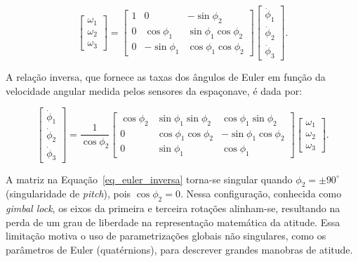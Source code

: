 \begin{equation}
\begin{bmatrix}
\omega_1 \\[2pt] \omega_2 \\[2pt] \omega_3
\end{bmatrix}
=
\begin{bmatrix}
1 & 0 & -\sin\phi_2 \\
0 & \cos\phi_1 & \sin\phi_1 \cos\phi_2 \\
0 & -\sin\phi_1 & \cos\phi_1 \cos\phi_2
\end{bmatrix}
\begin{bmatrix}
\dot{\phi}_1 \\[2pt] \dot{\phi}_2 \\[2pt] \dot{\phi}_3
\end{bmatrix}.
\label{eq_cinematica_euler}
\end{equation}

A relação inversa, que fornece as taxas dos ângulos de Euler em função da velocidade angular medida pelos sensores da espaçonave, é dada por:

\begin{equation}
\begin{bmatrix}
\dot{\phi}_1 \\[2pt] \dot{\phi}_2 \\[2pt] \dot{\phi}_3
\end{bmatrix}
=
\frac{1}{\cos\phi_2}
\begin{bmatrix}
\cos\phi_2 & \sin\phi_1 \sin\phi_2 & \cos\phi_1 \sin\phi_2 \\
0 & \cos\phi_1 \cos\phi_2 & -\sin\phi_1 \cos\phi_2 \\
0 & \sin\phi_1 & \cos\phi_1
\end{bmatrix}
\begin{bmatrix}
\omega_1 \\[2pt] \omega_2 \\[2pt] \omega_3
\end{bmatrix}.
\label{eq_euler_inversa}
\end{equation}

A matriz na Equação~\eqref{eq_euler_inversa} torna-se singular quando $\phi_2 = \pm 90^\circ$ (singularidade de \textit{pitch}), pois $\cos\phi_2 = 0$.
Nessa configuração, conhecida como \textit{gimbal lock}, os eixos da primeira e terceira rotações alinham-se, resultando na perda de um grau de liberdade na representação matemática da atitude.
Essa limitação motiva o uso de parametrizações globais não singulares, como os parâmetros de Euler (quatérnions), para descrever grandes manobras de atitude.